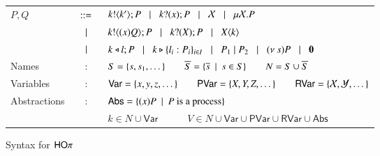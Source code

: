 \begin{figure}[t!]
		\begin{tabular}{lcl}
			$P,Q$	&$\;\;::=\;\;$&	$k ! \langle k' \rangle ; P \;\;\;|\;\;\; k ? (x) ; P \;\;\;|\;\;\; \mathcal{X} \;\;\;|\;\;\; \mu \mathcal{X}. P$\\
			&$\;\;\;|\;\;\;$&	$k ! \langle (x)Q \rangle ; P \;\;\;|\;\;\; k ? (X) ; P \;\;\;|\;\;\; X\langle k \rangle$\\ 
			&$\;\;\;|\;\;\;$&	$k \triangleleft l ; P \;\;\;|\;\;\; k \triangleright \{l_i:P_i\}_{i \in I} \;\;\;|\;\;\; 
					P_1 \;|\; P_2 \;\;\;|\;\;\; (\nu\ s) P \;\;\;|\;\;\; \mathbf{0}$\\
			Names & : & 	$S = \{s, s_1, \dots\} \qquad \overline{S} = \{\overline{s} \ \ |\ \  s \in S\} \qquad N = S \cup \overline{S}$\\
			Variables & : &	$\mathsf{Var} = \{x,y,z, \dots\} \qquad \mathsf{PVar} = \{X, Y, Z, \dots\}
					\qquad \mathsf{RVar} = \{\mathcal{X}, \mathcal{Y}, \dots\}$\\
			Abstractions & : & $\mathsf{Abs} = \{(x)P \ \ |\ \  P \textrm{ is a process}\}$\\
				& &	$k \in N \cup \mathsf{Var} \quad \qquad V \in N \cup \mathsf{Var} \cup \mathsf{PVar} \cup \mathsf{RVar} \cup \mathsf{Abs}$ 
		\end{tabular}
%
%

	\caption{Syntax for $\mathsf{HO}\pi$ \label{fig:syntax}}
\end{figure}

